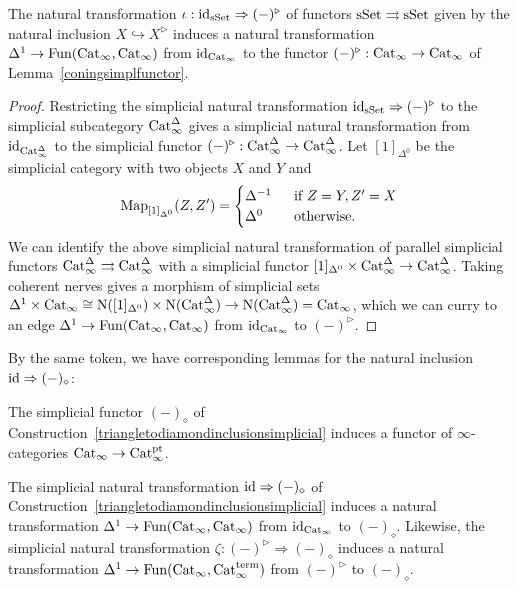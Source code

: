 \documentclass{tac}
\newcommand{\tx}[1]{\textnormal{#1}}
\begin{document}
\begin{lemma}\label{coneptsimplnatr} The natural transformation $\iota : \tx{id}_\tx{sSet} \Rightarrow (-)^\triangleright$ of functors $\tx{sSet}\rightrightarrows \tx{sSet}$ given by the natural inclusion $X \hookrightarrow X^\triangleright$ induces a natural transformation $\Delta^1 \to \tx{Fun}(\tx{Cat}_\infty , \tx{Cat}_\infty)$ from $\tx{id}_{\tx{Cat}_\infty}$ to the functor $(-)^\triangleright : \tx{Cat}_\infty \to \tx{Cat}_\infty$ of Lemma~\ref{coningsimplfunctor}.
\end{lemma}
\begin{proof} 
Restricting the simplicial natural transformation $\tx{id}_{\tx{sSet}} \Rightarrow (-)^\triangleright$ to the simplicial subcategory $\tx{Cat}_\infty^\Delta$ gives a simplicial natural transformation from $\tx{id}_{\tx{Cat}_\infty^\Delta}$ to the simplicial functor $(-)^\triangleright : \tx{Cat}_\infty^\Delta \to \tx{Cat}_\infty^\Delta$.  Let $[1]_{\Delta^0}$ be the simplicial category with two objects $X$ and $Y$ and
\[ \tx{Map}_{[1]_{\Delta^0}} (Z,Z') = \begin{cases}
\Delta^{-1} & \tx{\; if }Z=Y, Z'=X \\
\Delta^0 & \tx{\; otherwise}.
\end{cases} \]
We can identify the above simplicial natural transformation of parallel simplicial functors $ \tx{Cat}_\infty^\Delta \rightrightarrows \tx{Cat}_\infty^\Delta$ with a simplicial functor $[1]_{\Delta^0} \times \tx{Cat}_\infty^\Delta \to \tx{Cat}_\infty^\Delta$.  Taking coherent nerves gives a morphism of simplicial sets $\Delta^1 \times \tx{Cat}_\infty \cong \tx{N}([1]_{\Delta^0}) \times \tx{N}(\tx{Cat}_\infty^\Delta) \to \tx{N}(\tx{Cat}_\infty^\Delta) = \tx{Cat}_\infty$, which we can curry to an edge $\Delta^1 \to \tx{Fun}(\tx{Cat}_\infty , \tx{Cat}_\infty)$ from $\tx{id}_{\tx{Cat}_\infty}$ to $(-)^\triangleright$.
\end{proof}
By the same token, we have corresponding lemmas for the natural inclusion $\tx{id} \Rightarrow (-)_\diamond$:
\begin{lemma}\label{diamondinftyfunctor} The simplicial functor $(-)_\diamond$ of Construction~\ref{triangletodiamondinclusionsimplicial} induces a functor of $\infty$-categories $\tx{Cat}_\infty \to \tx{Cat}_\infty^\tx{pt}$.
\end{lemma}
\begin{lemma}\label{diamondinftynaturaltransf} The simplicial natural transformation $\tx{id} \Rightarrow (-)_\diamond$ of Construction~\ref{triangletodiamondinclusionsimplicial} induces a natural transformation $\Delta^1 \to \tx{Fun}(\tx{Cat}_\infty , \tx{Cat}_\infty)$ from $\tx{id}_{\tx{Cat}_\infty}$ to $(-)_\diamond$.  Likewise, the simplicial natural transformation $\zeta : (-)^\triangleright \Rightarrow (-)_\diamond$ induces a natural transformation $\Delta^1 \to \tx{Fun}(\tx{Cat}_\infty , \tx{Cat}_\infty^\tx{term})$ from $(-)^\triangleright$ to $(-)_\diamond$.
\end{lemma}
\end{document}
